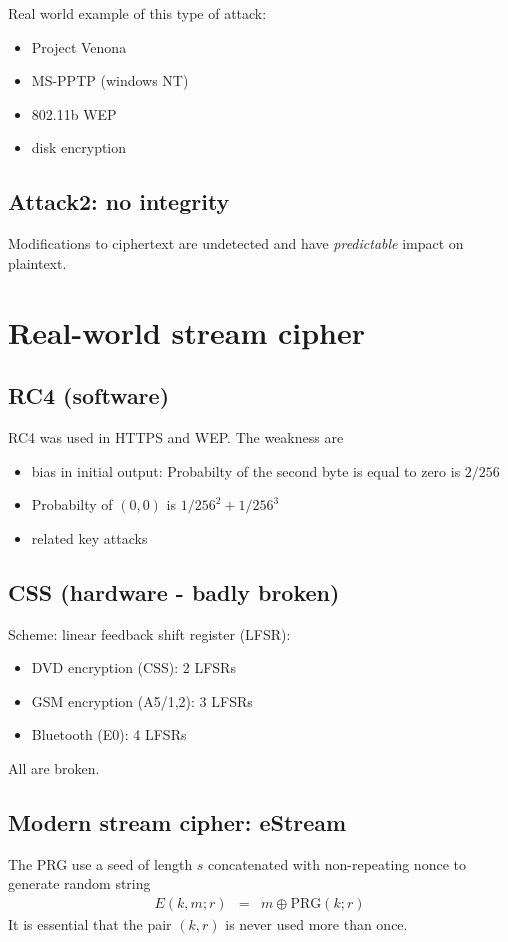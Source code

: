 \documentclass{article}
\begin{document}
Real world example of this type of attack:
\begin{itemize}
\item Project Venona
\item MS-PPTP (windows NT)
\item 802.11b WEP
\item disk encryption
\end{itemize}
\subsection{Attack2: no integrity}
Modifications to ciphertext are undetected and have \emph{predictable} impact on
plaintext. 

\section{Real-world stream cipher}
\subsection{RC4 (software)}
RC4 was used in HTTPS and WEP. The weakness are
\begin{itemize}
\item bias in initial output: Probabilty of the second byte is equal to zero is
  $2/256$ 
\item Probabilty of $(0,0)$ is $1/256^2 + 1/256^3$
\item related key attacks
\end{itemize}
\subsection{CSS (hardware - badly broken)}
Scheme: linear feedback shift register (LFSR):
\begin{itemize}
\item DVD encryption (CSS): 2 LFSRs
\item GSM encryption (A5/1,2): 3 LFSRs
\item Bluetooth (E0): 4 LFSRs
\end{itemize}
All are broken.

\subsection{Modern stream cipher: eStream}
The PRG use a seed of length $s$ concatenated with non-repeating nonce to
generate random string
\begin{eqnarray}
  E(k, m; r) &=& m \oplus \text{PRG}(k; r)
\end{eqnarray}
It is essential that the pair $(k, r)$ is never used more than once.
\end{document}
